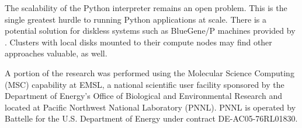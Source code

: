 \documentclass{sigplanconf}
\begin{document}
The scalability of the Python interpreter remains an open problem. This is the
single greatest hurdle to running Python applications at scale. There is a
potential solution for diskless systems such as BlueGene/P machines provided
by \cite{Scu11}. Clusters with local disks mounted to their compute nodes may
find other approaches valuable, as well.

%

\acks

A portion of the research was performed using the Molecular Science Computing
(MSC) capability at EMSL, a national scientific user facility sponsored by the
Department of Energy’s Office of Biological and Environmental Research and
located at Pacific Northwest National Laboratory (PNNL). PNNL is operated by
Battelle for the U.S. Department of Energy under contract DE-AC05-76RL01830.


%
%
\end{document}
